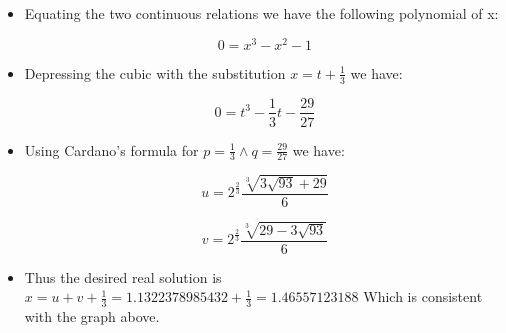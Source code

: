 \documentclass[]{report}
\begin{document}
\begin{itemize}
	\item Equating the two continuous relations we have the following polynomial of x:
	
	$$ 0 = x^3 - x^2 - 1$$
	
	
	\item Depressing the cubic with the substitution $x = t + \frac{1}{3}$ we have:
	
	$$ 0 = t^3 - \frac{1}{3} t - \frac{29}{27}$$
	
	
	\item Using Cardano's formula for $p = \frac{1}{3} \land q = \frac{29}{27}$ we have:
	
	
	$$ u = 2^{\frac{2}{3}} \frac{\sqrt[3]{3 \sqrt{93} +29}}{6}$$
	
	$$ v = 2^{\frac{2}{3}} \frac{\sqrt[3]{29 - 3 \sqrt{93}}}{6}$$
	
	\item Thus the desired real solution is $ x = u + v + \frac{1}{3} = 1.1322378985432 + \frac{1}{3} = 1.46557123188$ Which is consistent with the graph above.
	
\end{itemize}


	\begin{flushright}
		\smiley{}
	\end{flushright}
	
	
\end{document}
